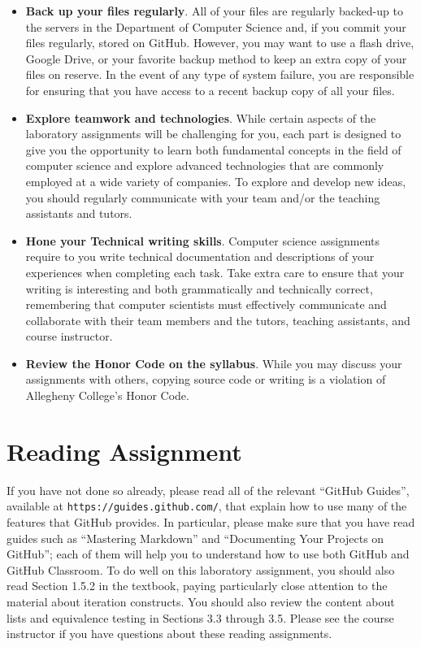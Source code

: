 \documentclass[11pt]{article}
\newcommand{\url}[1]{\lstinline{#1}}
\begin{document}
\begin{itemize}
\item {\bf Back up your files regularly}. All of your files are regularly backed-up to the servers in the Department of
  Computer Science and, if you commit your files regularly, stored on GitHub. However, you may want to use a flash
  drive, Google Drive, or your favorite backup method to keep an extra copy of your files on reserve. In the event of
  any type of system failure, you are responsible for ensuring that you have access to a recent backup copy of all your
  files.

\item {\bf Explore teamwork and technologies}. While certain aspects of the laboratory assignments will be challenging
  for you, each part is designed to give you the opportunity to learn both fundamental concepts in the field of computer
  science and explore advanced technologies that are commonly employed at a wide variety of companies. To explore and
  develop new ideas, you should regularly communicate with your team and/or the teaching assistants and tutors.

\item {\bf Hone your Technical writing skills}. Computer science assignments require to you write technical
  documentation and descriptions of your experiences when completing each task. Take extra care to ensure that your
  writing is interesting and both grammatically and technically correct, remembering that computer scientists must
  effectively communicate and collaborate with their team members and the tutors, teaching assistants, and course
  instructor.

\item {\bf Review the Honor Code on the syllabus}. While you may discuss your assignments with others, copying source
  code or writing is a violation of Allegheny College's Honor Code.

\end{itemize}

\section*{Reading Assignment}

If you have not done so already, please read all of the relevant ``GitHub
Guides'', available at \url{https://guides.github.com/}, that explain how to use
many of the features that GitHub provides. In particular, please make sure that
you have read guides such as ``Mastering Markdown'' and ``Documenting Your
Projects on GitHub''; each of them will help you to understand how to use both
GitHub and GitHub Classroom. To do well on this laboratory assignment, you
should also read Section 1.5.2 in the textbook, paying particularly close
attention to the material about iteration constructs. You should also review the
content about lists and equivalence testing in Sections 3.3 through 3.5. Please
see the course instructor if you have questions about these reading assignments.
\end{document}
